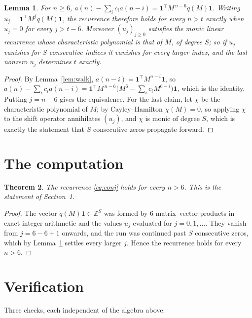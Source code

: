 \documentclass[11pt,a4paper]{article}
\theoremstyle{plain}
\newtheorem{theorem}{Theorem}
\newtheorem{lemma}[theorem]{Lemma}
\theoremstyle{definition}
\begin{document}
\begin{lemma}\label{lem:crit}
For $n\ge6$,
$a(n)-\sum_i c_i a(n-i)=\mathbf{1}^{\!\top}M^{\,n-6}q(M)\mathbf{1}$. Writing
$u_j=\mathbf{1}^{\!\top}M^{j}q(M)\mathbf{1}$, the recurrence therefore holds for every
$n>t$ exactly when $u_j=0$ for every $j>t-6$. Moreover $(u_j)_{j\ge0}$ satisfies the
monic linear recurrence whose characteristic polynomial is that of $M$, of degree $S$; so
if $u_j$ vanishes for $S$ consecutive indices it vanishes for every larger index, and the
last nonzero $u_j$ determines $t$ exactly.
\end{lemma}

\begin{proof}
By Lemma~\ref{lem:walk}, $a(n-i)=\mathbf{1}^{\!\top}M^{n-i}\mathbf{1}$, so
$a(n)-\sum_i c_i a(n-i)
=\mathbf{1}^{\!\top}M^{\,n-6}\bigl(M^{6}-\sum_i c_i M^{6-i}\bigr)
\mathbf{1}$, which is the identity. Putting $j=n-6$ gives the equivalence. For the
last claim, let $\chi$ be the characteristic polynomial of $M$; by Cayley--Hamilton
$\chi(M)=0$, so applying $\chi$ to the shift operator annihilates $(u_j)$, and $\chi$ is
monic of degree $S$, which is exactly the statement that $S$ consecutive zeros propagate
forward.
\end{proof}

\section{The computation}

\begin{theorem}
The recurrence \eqref{eq:conj} holds for every $n>6$. This is the statement of
Section~1.
\end{theorem}

\begin{proof}
The vector $q(M)\mathbf{1}\in\mathbb{Z}^{S}$ was formed by $6$ matrix--vector
products in exact integer arithmetic and the values $u_j$ evaluated for
$j=0,1,\dots$. They vanish from $j=6-6+1$ onwards, and the run was continued past
$S$ consecutive zeros, which by Lemma~\ref{lem:crit} settles every larger $j$. Hence the
recurrence holds for every $n>6$.
\end{proof}

\section{Verification}

Three checks, each independent of the algebra above.
\end{document}
